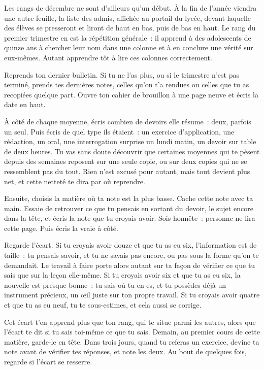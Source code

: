 \documentclass[10.5pt,twoside,openright]{book}
\newcommand{\soustitre}[1]{\par\vspace{1.1em}\noindent{\bfseries\color{accent}#1}\par\vspace{0.4em}\noindent}
\begin{document}
Les rangs de décembre ne sont d’ailleurs qu’un début. À la fin de l’année viendra une autre feuille, la liste des admis, affichée au portail du lycée, devant laquelle des élèves se presseront et liront de haut en bas, puis de bas en haut. Le rang du premier trimestre en est la répétition générale : il apprend à des adolescents de quinze ans à chercher leur nom dans une colonne et à en conclure une vérité sur eux-mêmes. Autant apprendre tôt à lire ces colonnes correctement.

\soustitre{Ce soir, essaie ceci}

Reprends ton dernier bulletin. Si tu ne l’as plus, ou si le trimestre n’est pas terminé, prends tes dernières notes, celles qu’on t’a rendues ou celles que tu as recopiées quelque part. Ouvre ton cahier de brouillon à une page neuve et écris la date en haut.

À côté de chaque moyenne, écris combien de devoirs elle résume : deux, parfois un seul. Puis écris de quel type ils étaient : un exercice d’application, une rédaction, un oral, une interrogation surprise un lundi matin, un devoir sur table de deux heures. Tu vas sans doute découvrir que certaines moyennes qui te pèsent depuis des semaines reposent sur une seule copie, ou sur deux copies qui ne se ressemblent pas du tout. Rien n’est excusé pour autant, mais tout devient plus net, et cette netteté te dira par où reprendre.

Ensuite, choisis la matière où ta note est la plus basse. Cache cette note avec ta main. Essaie de retrouver ce que tu pensais en sortant du devoir, le sujet encore dans la tête, et écris la note que tu croyais avoir. Sois honnête : personne ne lira cette page. Puis écris la vraie à côté.

Regarde l’écart. Si tu croyais avoir douze et que tu as eu six, l’information est de taille : tu pensais savoir, et tu ne savais pas encore, ou pas sous la forme qu’on te demandait. Le travail à faire porte alors autant sur ta façon de vérifier ce que tu sais que sur la leçon elle-même. Si tu croyais avoir six et que tu as eu six, la nouvelle est presque bonne : tu sais où tu en es, et tu possèdes déjà un instrument précieux, un œil juste sur ton propre travail. Si tu croyais avoir quatre et que tu as eu neuf, tu te sous-estimes, et cela aussi se corrige.

Cet écart t’en apprend plus que ton rang, qui te situe parmi les autres, alors que l’écart te dit si tu sais toi-même ce que tu sais. Demain, au premier cours de cette matière, garde-le en tête. Dans trois jours, quand tu referas un exercice, devine ta note avant de vérifier tes réponses, et note les deux. Au bout de quelques fois, regarde si l’écart se resserre.
\end{document}
